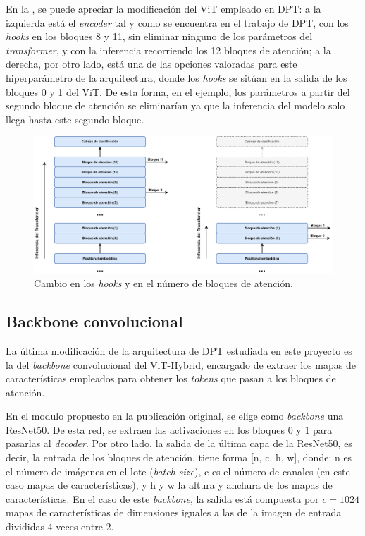 En la , se puede apreciar la modificación del ViT empleado en DPT: a la izquierda está el \textit{encoder} tal y como se encuentra en el trabajo de DPT, con los \textit{hooks} en los bloques 8 y 11, sin eliminar ninguno de los parámetros del \textit{transformer}, y con la inferencia recorriendo los 12 bloques de atención; a la derecha, por otro lado, está una de las opciones valoradas para este hiperparámetro de la arquitectura, donde los \textit{hooks} se sitúan en la salida de los bloques 0 y 1 del ViT. De esta forma, en el ejemplo, los parámetros a partir del segundo bloque de atención se eliminarían ya que la inferencia del modelo solo llega hasta este segundo bloque.

\begin{figure}[H]
\centering
\includegraphics[width=\textwidth]{imagenes/DPT-cambio-bloques-transformer.png}
\caption{Cambio en los \textit{hooks} y en el número de bloques de atención.}
\label{fig:attention_block_num}
\end{figure}

\subsection{Backbone convolucional}
La última modificación de la arquitectura de DPT estudiada en este proyecto es la del \textit{backbone} convolucional del ViT-Hybrid, encargado de extraer los mapas de características empleados para obtener los \textit{tokens} que pasan a los bloques de atención. 

En el modulo propuesto en la publicación original, se elige como \textit{backbone} una ResNet50. De esta red, se extraen las activaciones en los bloques 0 y 1 para pasarlas al \textit{decoder}. Por otro lado, la salida de la última capa de la ResNet50, es decir, la entrada de los bloques de atención, tiene forma [n, c, h, w], donde: n es el número de imágenes en el lote (\textit{batch size}), c es el número de canales (en este caso mapas de características), y h y w la altura y anchura de los mapas de características. En el caso de este \textit{backbone}, la salida está compuesta por $c=1024$ mapas de características de dimensiones iguales a las de la imagen de entrada divididas 4 veces entre 2.

